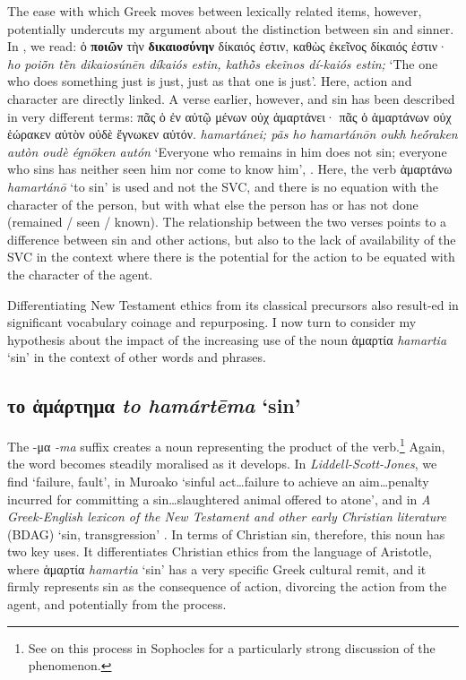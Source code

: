 \documentclass[output=paper,colorlinks,citecolor=brown]{langscibook}
\begin{document}
The ease with which Greek moves between lexically related items,
however, potentially undercuts my argument about the distinction between
sin and sinner. 
In , we read: ὁ \textbf{ποιῶν} τὴν
\textbf{δικαιοσύνην} δίκαιός ἐστιν, καθὼς ἐκεῖνος δίκαιός ἐστιν· \textit{ho poiō̃n tḕn dikaiosúnēn díkaiós estin, kathṑs ekeĩnos dí-kaiós estin;} ‘The one
who does something just is just, just as that one is just'. 
Here, action
and character are directly linked. 
A verse earlier, however, and sin has
been described in very different terms: πᾶς ὁ ἐν αὐτῷ μένων οὐχ
ἁμαρτάνει· πᾶς ὁ ἁμαρτάνων οὐχ ἑώρακεν αὐτὸν οὐδὲ ἔγνωκεν αὐτόν.
\textit{hamartánei; pãs ho hamartánōn oukh heṓraken autòn oudè égnōken autón} ‘Everyone who remains in him does not sin; everyone who sins has neither
seen him nor come to know him', . 
Here, the verb ἁμαρτάνω \textit{hamartánō} ‘to sin' is
used and not the SVC, and there is no equation with the character of the
person, but with what else the person has or has not done (remained /
seen / known). 
The relationship between the two verses points to a
difference between sin and other actions, but also to the lack of
availability of the SVC in the context where there is the potential for
the action to be equated with the character of the agent.

Differentiating New Testament ethics from its classical precursors also
result-ed in significant vocabulary coinage and repurposing. 
I now turn %
to consider my hypothesis about the impact of the increasing use of the
noun ἁμαρτία \textit{hamartia} ‘sin' in the context of  other words and phrases.

\hypertarget{a.-ux3c4ux3bf-ux1f01ux3bcux1f71ux3c1ux3c4ux3b7ux3bcux3b1-sin}{%
\subsection{το ἁμάρτημα
\textit{to hamártēma} ‘sin'}\label{a.-ux3c4ux3bf-ux1f01ux3bcux1f71ux3c1ux3c4ux3b7ux3bcux3b1-sinCR}}

The -μα \textit{-ma} suffix creates a noun representing the product of the
verb.\footnote{See \citet{long_language_1968} on this process in Sophocles for a
  particularly strong discussion of the phenomenon.} 
  Again, the word
becomes steadily moralised as it develops. 
In \textit{Liddell-Scott-Jones}, we find
`failure, fault', in Muroako `sinful act\ldots failure
to achieve an aim\ldots penalty incurred for committing a
sin\ldots slaughtered animal offered to atone', and in \textit{A Greek-English lexicon of the New Testament and other early Christian literature} (BDAG)
`sin, transgression' \citep {liddell_greek-english_1996, muraoka_greek-english_2009, arndt_greek-english_2000}. 
In terms
of Christian sin, therefore, this noun has two key uses. 
It
differentiates Christian ethics from the language of Aristotle, where
ἁμαρτία \textit{hamartia} ‘sin' has a very specific Greek cultural remit, and it firmly
represents sin as the consequence of action, divorcing the action from
the agent, and potentially from the process.
\end{document}
